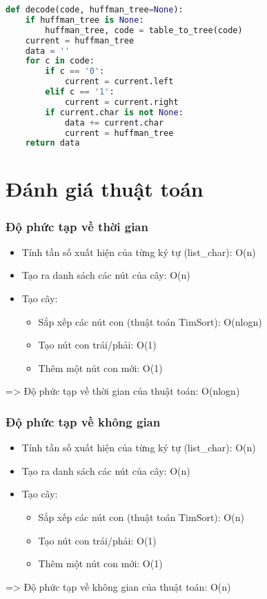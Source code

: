 \begin{lstlisting}[language=Python]
def decode(code, huffman_tree=None):
    if huffman_tree is None:
        huffman_tree, code = table_to_tree(code)
    current = huffman_tree
    data = ''
    for c in code:
        if c == '0':
            current = current.left
        elif c == '1':
            current = current.right
        if current.char is not None:
            data += current.char
            current = huffman_tree
    return data
\end{lstlisting}

\section{Đánh giá thuật toán}
\subsubsection{Độ phức tạp về thời gian}
    \begin{itemize}
        \item Tính tần số xuất hiện của từng ký tự (list\_char): O(n)
        \item Tạo ra danh sách các nút của cây: O(n)
        \item Tạo cây:
            \begin{itemize}
                \item Sắp xếp các nút con (thuật toán TimSort): O(nlogn)
                \item Tạo nút con trái/phải: O(1)
                \item Thêm một nút con mới: O(1) 
            \end{itemize}
    \end{itemize}
    => Độ phức tạp về thời gian của thuật toán: O(nlogn)
\subsubsection{Độ phức tạp về không gian}
    \begin{itemize}
        \item Tính tần số xuất hiện của từng ký tự (list\_char): O(n)
        \item Tạo ra danh sách các nút của cây: O(n)
        \item Tạo cây:
            \begin{itemize}
                \item Sắp xếp các nút con (thuật toán TimSort): O(n)
                \item Tạo nút con trái/phải: O(1)
                \item Thêm một nút con mới: O(1)
            \end{itemize}
    \end{itemize}
    => Độ phức tạp về không gian của thuật toán: O(n)
    
